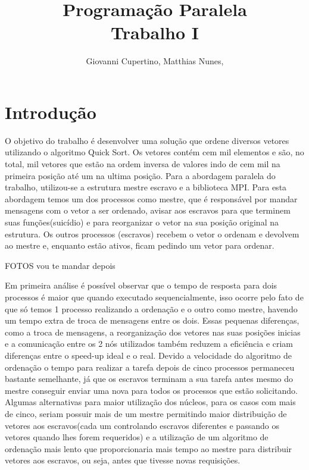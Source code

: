 \documentclass[9pt]{IEEEtran}
\title{Programação Paralela\\ Trabalho I}
\author{Giovanni Cupertino, Matthias Nunes, \IEEEmembership{Usuário pp12820}}
\begin{document}
\maketitle

\section{Introdução}

O objetivo do trabalho é desenvolver uma solução que ordene diversos vetores utilizando o algoritmo Quick Sort.  Os vetores contém cem mil elementos e são, no total, mil vetores que estão na ordem inversa de valores indo de cem mil na primeira posição até um na ultima posição. 
Para a abordagem paralela do trabalho, utilizou-se a estrutura mestre escravo e a biblioteca MPI. Para esta abordagem temos um dos processos como mestre, que é responsável por mandar mensagens com o vetor a ser ordenado, avisar aos escravos para que terminem suas funções(suicídio) e para reorganizar o vetor na sua posição original na estrutura. Os outros processos (escravos) recebem o vetor o ordenam e devolvem ao mestre e, enquanto estão ativos, ficam pedindo um vetor para ordenar.

FOTOS vou te mandar depois

Em primeira análise é possível observar que o tempo de resposta para dois processos é maior que quando executado sequencialmente, isso ocorre pelo fato de que só temos 1 processo realizando a ordenação e o outro como mestre, havendo um tempo extra de troca de mensagens entre os dois. Essas pequenas diferenças, como a troca de mensagens, a reorganização dos vetores nas suas posições inicias e a comunicação entre os 2 nós utilizados também reduzem a eficiência e criam diferenças entre o speed-up ideal e o real.
Devido a velocidade do algoritmo de ordenação o tempo para realizar a tarefa depois de cinco processos permaneceu bastante semelhante, já que os escravos terminam a sua tarefa antes mesmo do mestre conseguir enviar uma nova para todos os processos que estão solicitando. Algumas alternativas para maior utilização dos núcleos, para os casos com mais de cinco, seriam possuir mais de um mestre permitindo maior distribuição de vetores aos escravos(cada um controlando escravos diferentes e passando os vetores quando lhes forem requeridos) e a utilização de um algoritmo de ordenação mais lento que proporcionaria mais tempo ao mestre para distribuir vetores aos escravos, ou seja, antes que tivesse novas requisições.
\end{document}

